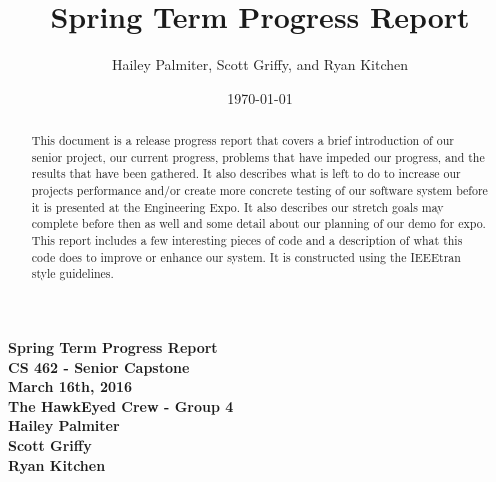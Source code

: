 \documentclass[letterpaper,10pt,titlepage]{IEEEtran}
\title{Spring Term Progress Report}
\author{Hailey Palmiter, Scott Griffy, and Ryan Kitchen}
\date{\today}
\begin{document}
   \begin{titlepage}
      \centering
      \vfill
      {\bfseries\Large
         Spring Term Progress Report \\
         CS 462 - Senior Capstone\\
         \vskip2cm
         March 16th, 2016\\
         \vskip2cm
         The HawkEyed Crew - Group 4\\ 
         \vskip1cm
         Hailey Palmiter\\
         \vskip1cm
         Scott Griffy\\
         \vskip1cm
         Ryan Kitchen\\
    
      }
      \vfill
      \vskip2cm
      \begin{abstract}
      This document is a release progress report that covers a brief introduction of our senior project, our current progress, problems that have impeded our progress, and the results that have been gathered. It also describes what is left to do to increase our projects performance and/or create more concrete testing of our software system before it is presented at the Engineering Expo. It also describes our stretch goals may complete before then as well and some detail about our planning of our demo for expo. This report includes a few interesting pieces of code and a description of what this code does to improve or enhance our system. It is constructed using the IEEEtran style guidelines.
      \end{abstract}
      \vfill
   \end{titlepage}
   
   \onecolumn
   \tableofcontents
   \newpage
   \bigskip
\end{document}
